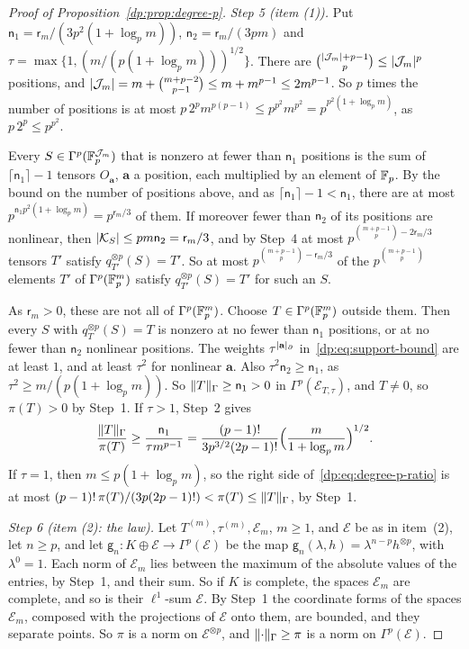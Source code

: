 \begin{proof}[Proof of Proposition~\ref{dp:prop:degree-p}]
\emph{Step 5 (item (1)).} Put $\mathsf n_1=\mathsf r_m/(3p^2(1+\log_pm))$, $\mathsf n_2=\mathsf r_m/(3pm)$ and $\tau=\max\{1,(m/(p(1+\log_pm)))^{1/2}\}$. There are $\binom{\lvert \mathcal J_m\rvert+p-1}p\le\lvert \mathcal J_m\rvert^p$ positions, and $\lvert \mathcal J_m\rvert=m+\binom{m+p-2}{p-1}\le m+m^{p-1}\le2m^{p-1}$. So $p$ times the number of positions is at most $p\,2^pm^{p(p-1)}\le p^{p^2}m^{p^2}=p^{p^2(1+\log_pm)}$, as $p\,2^p\le p^{p^2}$.

Every $S\in\Gamma^p(\mathbb F_p^{\mathcal J_m})$ that is nonzero at fewer than $\mathsf n_1$ positions is the sum of $\lceil\mathsf n_1\rceil-1$ tensors $O_{\mathbf a}$, $\mathbf a$ a position, each multiplied by an element of $\mathbb F_p$. By the bound on the number of positions above, and as $\lceil\mathsf n_1\rceil-1<\mathsf n_1$, there are at most $p^{\mathsf n_1p^2(1+\log_pm)}=p^{\mathsf r_m/3}$ of them. If moreover fewer than $\mathsf n_2$ of its positions are nonlinear, then $\lvert \mathcal K_S\rvert\le pm\mathsf n_2=\mathsf r_m/3$, and by Step~4 at most $p^{\binom{m+p-1}p-2\mathsf r_m/3}$ tensors $T'$ satisfy $q_{T'}^{\otimes p}(S)=T'$. So at most $p^{\binom{m+p-1}p-\mathsf r_m/3}$ of the $p^{\binom{m+p-1}p}$ elements $T'$ of $\Gamma^p(\mathbb F_p^m)$ satisfy $q_{T'}^{\otimes p}(S)=T'$ for such an $S$.

As $\mathsf r_m>0$, these are not all of $\Gamma^p(\mathbb F_p^m)$. Choose $T\in\Gamma^p(\mathbb F_p^m)$ outside them. Then every $S$ with $q_T^{\otimes p}(S)=T$ is nonzero at no fewer than $\mathsf n_1$ positions, or at no fewer than $\mathsf n_2$ nonlinear positions. The weights $\tau^{\lvert \mathbf a\rvert_\partial}$ in~\eqref{dp:eq:support-bound} are at least $1$, and at least $\tau^2$ for nonlinear $\mathbf a$. Also $\tau^2\mathsf n_2\ge\mathsf n_1$, as $\tau^2\ge m/(p(1+\log_pm))$. So $\lVert T\rVert_\Gamma\ge\mathsf n_1>0$ in $\Gamma^p(\mathcal E_{T,\tau})$, and $T\ne0$, so $\pi(T)>0$ by Step~1. If $\tau>1$, Step~2 gives
\[
 \frac{\lVert T\rVert_\Gamma}{\pi(T)}\ge\frac{\mathsf n_1}{\tau m^{p-1}}=\frac{(p-1)!}{3p^{3/2}(2p-1)!}\Bigl(\frac m{1+\log_pm}\Bigr)^{1/2}.
\]
If $\tau=1$, then $m\le p(1+\log_pm)$, so the right side of~\eqref{dp:eq:degree-p-ratio} is at most $(p-1)!\,\pi(T)/(3p(2p-1)!)<\pi(T)\le\lVert T\rVert_\Gamma$, by Step~1.

\emph{Step 6 (item (2): the law).} Let $T^{(m)},\tau^{(m)},\mathcal E_m$, $m\ge1$, and $\mathcal E$ be as in item~(2), let $n\ge p$, and let $\mathsf g_n\colon K\oplus\mathcal E\to\Gamma^p(\mathcal E)$ be the map $\mathsf g_n(\lambda,h)=\lambda^{n-p}h^{\otimes p}$, with $\lambda^0=1$. Each norm of $\mathcal E_m$ lies between the maximum of the absolute values of the entries, by Step~1, and their sum. So if $K$ is complete, the spaces $\mathcal E_m$ are complete, and so is their $\ell^1$-sum $\mathcal E$. By Step~1 the coordinate forms of the spaces $\mathcal E_m$, composed with the projections of $\mathcal E$ onto them, are bounded, and they separate points. So $\pi$ is a norm on $\mathcal E^{\otimes p}$, and $\lVert \cdot\rVert_\Gamma\ge\pi$ is a norm on $\Gamma^p(\mathcal E)$.


\end{proof}
